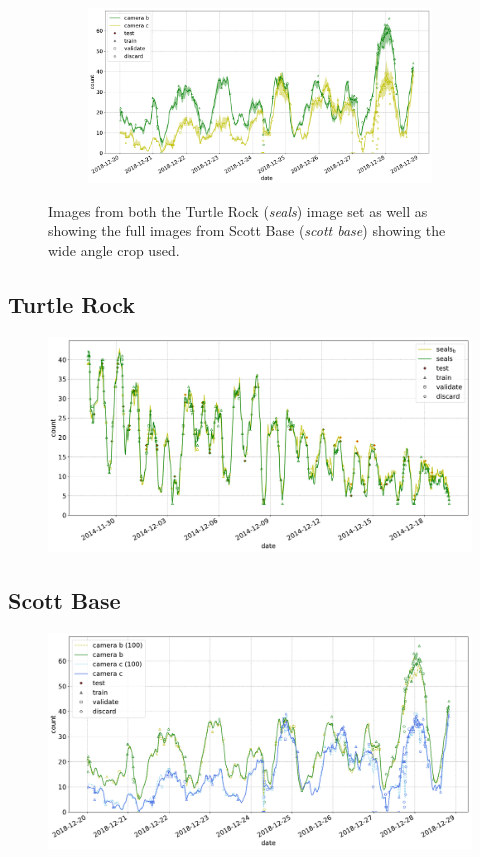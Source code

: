\begin{figure}[h!]
\begin{subfigure}[t]{1.0\linewidth}
  \includegraphics[width=1.0\linewidth]{charts/seals/scott_base.pdf}
  \caption{}
\end{subfigure}

\caption{ Images from both the Turtle Rock (\emph{seals}) image set as well as showing the full images from Scott Base (\emph{scott base}) showing the wide angle crop used.  }
\label {fig:weddell_images}
\end{figure}

\subsection{Turtle Rock \cite{Eisert2015}}
 
\begin{figure}
    \centering
    \includegraphics[width=1.0\linewidth]{charts/seals/seals_combined.pdf}
    \caption{}
    \label{fig:seals_timeseries}
\end{figure}


\subsection{Scott Base \cite{Eisert2019}}

\begin{figure}
    \centering
    \includegraphics[width=1.0\linewidth]{charts/seals/scott_base_combined.pdf}
    \caption{}
    \label{fig:seals_timeseries}
\end{figure}

